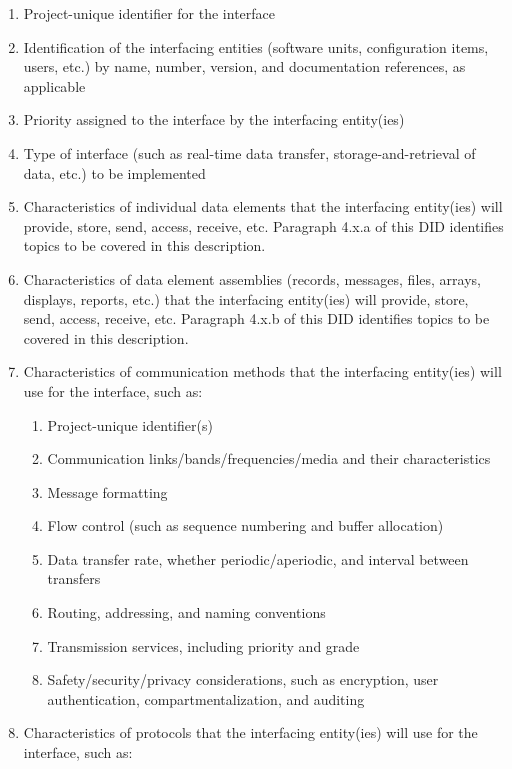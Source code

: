 \documentclass{fidata-report-template}
\begin{document}
\begin{enumerate}
  \begin{enumerate}
  \itemsep1pt\parskip0pt
  \item
    Project-unique identifier for the interface
  \item
    Identification of the interfacing entities (software units,
    configuration items, users, etc.) by name, number, version, and
    documentation references, as applicable
  \item
    Priority assigned to the interface by the interfacing entity(ies)
  \item
    Type of interface (such as real-time data transfer,
    storage-and-retrieval of data, etc.) to be implemented
  \item
    Characteristics of individual data elements that the interfacing
    entity(ies) will provide, store, send, access, receive, etc.
    Paragraph 4.x.a of this DID identifies topics to be covered in this
    description.
  \item
    Characteristics of data element assemblies (records, messages,
    files, arrays, displays, reports, etc.) that the interfacing
    entity(ies) will provide, store, send, access, receive, etc.
    Paragraph 4.x.b of this DID identifies topics to be covered in this
    description.
  \item
    Characteristics of communication methods that the interfacing
    entity(ies) will use for the interface, such as:

    \begin{enumerate}
    \itemsep1pt\parskip0pt
    \item
      Project-unique identifier(s)
    \item
      Communication links/bands/frequencies/media and their
      characteristics
    \item
      Message formatting
    \item
      Flow control (such as sequence numbering and buffer allocation)
    \item
      Data transfer rate, whether periodic/aperiodic, and interval
      between transfers
    \item
      Routing, addressing, and naming conventions
    \item
      Transmission services, including priority and grade
    \item
      Safety/security/privacy considerations, such as encryption, user
      authentication, compartmentalization, and auditing
    \end{enumerate}
  \item
    Characteristics of protocols that the interfacing entity(ies) will
    use for the interface, such as:


\end{enumerate}
\end{enumerate}
\end{document}

